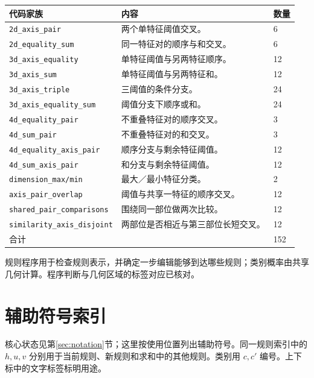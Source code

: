 \documentclass[12pt]{article}
\begin{document}
{\small
\begin{longtable}{L{5.5cm}L{6.7cm}L{1.3cm}}
\toprule
代码家族 & 内容 & 数量\\
\midrule
\endhead
\texttt{2d\_axis\_pair} & 两个单特征阈值交叉。 & 6\\
\texttt{2d\_equality\_sum} & 同一特征对的顺序与和交叉。 & 6\\
\texttt{3d\_axis\_equality} & 单特征阈值与另两特征顺序。 & 12\\
\texttt{3d\_axis\_sum} & 单特征阈值与另两特征和。 & 12\\
\texttt{3d\_axis\_triple} & 三阈值的条件分支。 & 24\\
\texttt{3d\_axis\_equality\_sum} & 阈值分支下顺序或和。 & 24\\
\texttt{4d\_equality\_pair} & 不重叠特征对的顺序交叉。 & 3\\
\texttt{4d\_sum\_pair} & 不重叠特征对的和交叉。 & 3\\
\texttt{4d\_equality\_axis\_pair} & 顺序分支与剩余特征阈值。 & 12\\
\texttt{4d\_sum\_axis\_pair} & 和分支与剩余特征阈值。 & 12\\
\texttt{dimension\_max/min} & 最大／最小特征分类。 & 2\\
\texttt{axis\_pair\_overlap} & 阈值与共享一特征的顺序交叉。 & 12\\
\texttt{shared\_pair\_comparisons} & 围绕同一部位做两次比较。 & 12\\
\texttt{similarity\_axis\_disjoint} & 两部位是否相近与第三部位长短交叉。 & 12\\
\midrule
合计 & & 152\\
\bottomrule
\end{longtable}
}
规则程序用于检查规则表示，并确定一步编辑能够到达哪些规则；类别概率由共享几何计算。程序判断与几何区域的标签对应已核对。

\clearpage
\section{辅助符号索引}
\label{app:notation}

核心状态见第\ref{sec:notation}节；这里按使用位置列出辅助符号。同一规则索引中的 $h,u,v$ 分别用于当前规则、新规则和求和中的其他规则。类别用 $c,c'$ 编号。上下标中的文字标签标明用途。
\end{document}
